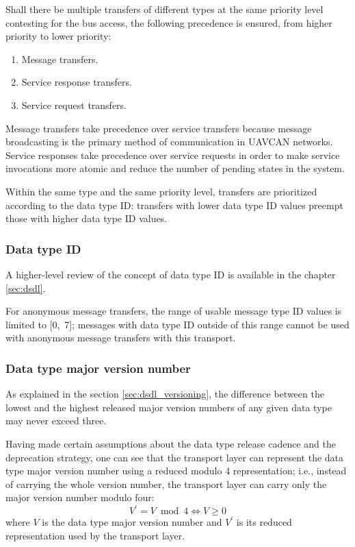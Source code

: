 Shall there be multiple transfers of different types at the same priority level contesting for the bus access,
the following precedence is ensured, from higher priority to lower priority:

\begin{enumerate}
    \item Message transfers.
    \item Service response transfers.
    \item Service request transfers.
\end{enumerate}

Message transfers take precedence over service transfers because message broadcasting is the primary method of
communication in UAVCAN networks.
Service responses take precedence over service requests in order to make service invocations more atomic
and reduce the number of pending states in the system.

Within the same type and the same priority level,
transfers are prioritized according to the data type ID:
transfers with lower data type ID values preempt those with higher data type ID values.

\subsubsection{Data type ID}

A higher-level review of the concept of data type ID is available in the chapter \ref{sec:dsdl}.

For anonymous message transfers, the range of usable message type ID values is limited to [0,~7];
messages with data type ID outside of this range cannot be used with anonymous message
transfers with this transport.

\subsubsection{Data type major version number}

As explained in the section \ref{sec:dsdl_versioning},
the difference between the lowest and the highest released major version numbers of any given data type
may never exceed three.

Having made certain assumptions about the data type release cadence and the deprecation strategy,
one can see that the transport layer can represent the data type major version number using a reduced
modulo 4 representation; i.e., instead of carrying the whole version number, the transport layer
can carry only the major version number modulo four:
$$V^\prime{} = V \bmod 4 \Leftrightarrow{} V \geq{} 0$$
where $V$ is the data type major version number and $V^\prime{}$ is its reduced representation used by
the transport layer.

